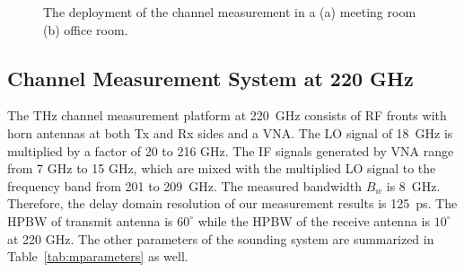 \documentclass[conference]{IEEEtran}
\begin{document}
\begin{figure*}[htbp]
\centering
    \label{fig:deployment_meeting}
\caption{The deployment of the channel measurement in a (a) meeting room (b) office room.}
\label{fig:deployment}
\end{figure*}

\subsection{Channel Measurement System at 220 GHz}
\par The THz channel measurement platform at 220~GHz consists of RF fronts with horn antennas at both Tx and Rx sides and a VNA. The LO signal of 18~GHz is multiplied by a factor of 20 to 216 GHz. The IF signals generated by VNA range from 7 GHz to 15 GHz, which are mixed with the multiplied LO signal to the frequency band from 201 to 209~GHz. The measured bandwidth $B_w$ is 8~GHz. Therefore, the delay domain resolution of our measurement results is 125~ps. The HPBW of transmit antenna is $60^\circ$ while the HPBW of the receive antenna is $10^\circ$ at 220 GHz. The other parameters of the sounding system are summarized in Table~\ref{tab:mparameters} as well.

\end{document}

